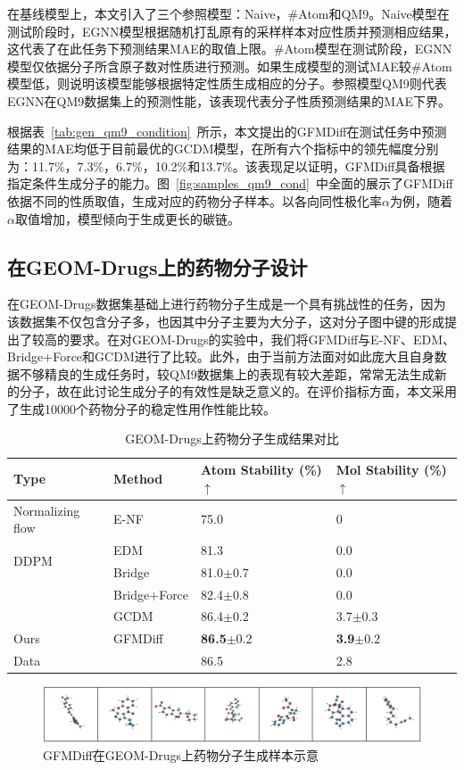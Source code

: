 在基线模型上，本文引入了三个参照模型：Naive，\#Atom和QM9。Naive模型在测试阶段时，EGNN模型根据随机打乱原有的采样样本对应性质并预测相应结果，这代表了在此任务下预测结果MAE的取值上限。\#Atom模型在测试阶段，EGNN模型仅依据分子所含原子数对性质进行预测。如果生成模型的测试MAE较\#Atom模型低，则说明该模型能够根据特定性质生成相应的分子。参照模型QM9则代表EGNN在QM9数据集上的预测性能，该表现代表分子性质预测结果的MAE下界。

根据表~\ref{tab:gen_qm9_condition}~所示，本文提出的GFMDiff在测试任务中预测结果的MAE均低于目前最优的GCDM模型，在所有六个指标中的领先幅度分别为：11.7\%，7.3\%，6.7\%，10.2\%和13.7\%。该表现足以证明，GFMDiff具备根据指定条件生成分子的能力。图~\ref{fig:samples_qm9_cond}~中全面的展示了GFMDiff依据不同的性质取值，生成对应的药物分子样本。以各向同性极化率$\alpha$为例，随着$\alpha$取值增加，模型倾向于生成更长的碳链。

\subsection{在GEOM-Drugs上的药物分子设计}
在GEOM-Drugs数据集基础上进行药物分子生成是一个具有挑战性的任务，因为该数据集不仅包含分子多，也因其中分子主要为大分子，这对分子图中键的形成提出了较高的要求。在对GEOM-Drugs的实验中，我们将GFMDiff与E-NF、EDM、Bridge+Force和GCDM进行了比较。此外，由于当前方法面对如此庞大且自身数据不够精良的生成任务时，较QM9数据集上的表现有较大差距，常常无法生成新的分子，故在此讨论生成分子的有效性是缺乏意义的。在评价指标方面，本文采用了生成10000个药物分子的稳定性用作性能比较。

\begin{table}[h]
    \centering
    \caption{GEOM-Drugs上药物分子生成结果对比}
    \label{tab:gen_drugs}
    \begin{tabular}{llll}
    \toprule
    Type & Method & Atom Stability (\%) $\uparrow$ & Mol Stability (\%) $\uparrow$ \\
    \midrule
    Normalizing flow & E-NF & 75.0 & 0 \\
    \multirow{2}{*}{DDPM}
    & EDM  & 81.3 & 0.0 \\
    & Bridge & 81.0$\pm$0.7 & 0.0 \\
    & Bridge+Force & 82.4$\pm$0.8 & 0.0 \\
    & GCDM & 86.4$\pm$0.2 & 3.7$\pm$0.3 \\
    \midrule
    Ours & GFMDiff & \textbf{86.5}$\pm$0.2 & \textbf{3.9}$\pm$0.2 \\
    \midrule
    Data &  & 86.5 & 2.8 \\
    \bottomrule
    \end{tabular}
\end{table}
\begin{figure}[h]
    \centering
    \includegraphics[width=\linewidth]{figures/samples_drugs.png}
    \caption{GFMDiff在GEOM-Drugs上药物分子生成样本示意}
    \label{fig:samples_drugs}
\end{figure}


